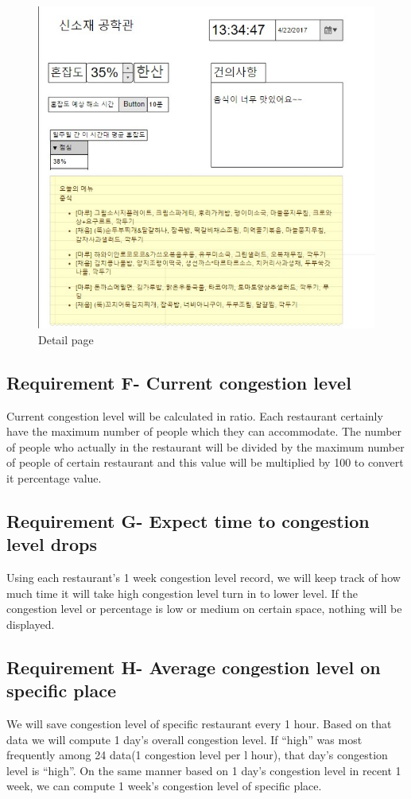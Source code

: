 \documentclass[journal]{IEEEtran}
\begin{document}
\begin{figure}[h]
\centering
\includegraphics[scale=0.5]{detailpage.jpg}
\caption{Detail page}
\label{fig:Detail page}
\end{figure}

\subsection{Requirement F- Current congestion level }
Current congestion level will be calculated in ratio. Each restaurant certainly have the maximum number of people which they can accommodate. The number of people who actually in the restaurant will be divided by the maximum number of people of certain restaurant and this value will be multiplied by 100 to convert it percentage value.
\subsection{Requirement G- Expect time to congestion level drops}
Using each restaurant’s 1 week congestion level record, we will keep track of how much time it will take high congestion level turn in to lower level. If the congestion level or percentage is low or medium on certain space, nothing will be displayed.
\subsection{Requirement H- Average congestion level on specific place}
We will save congestion level of specific restaurant every 1 hour. Based on that data we will compute 1 day’s overall congestion level. If “high” was most frequently among 24 data(1 congestion level per l hour), that day’s congestion level is “high”. On the same manner based on 1 day’s congestion level in recent 1 week, we can compute 1 week’s congestion level of specific place.
\end{document}
